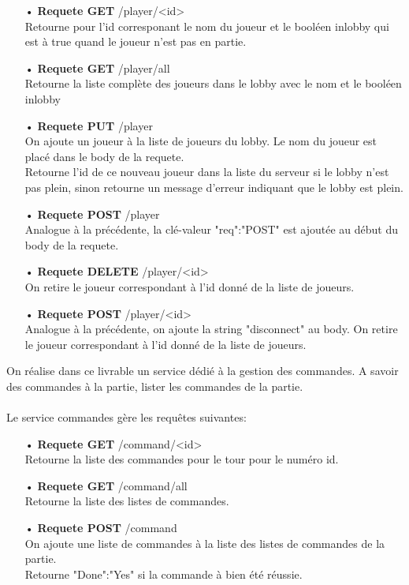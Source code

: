 \begin{itemize}
         \item[•]  \textbf{Requete GET}    /player/<id>\\
Retourne pour l'id corresponant le nom du joueur et le 
booléen inlobby qui est à true quand le joueur n'est pas en 
partie.

         \item[•]  \textbf{Requete GET}    /player/all\\
Retourne la liste complète des joueurs dans le lobby avec le
nom et le booléen inlobby

         \item[•]  \textbf{Requete PUT}    /player\\
On ajoute un joueur à la liste de joueurs du lobby. Le nom 
du joueur est placé dans le body de la requete. 
\\Retourne l'id de ce nouveau joueur dans la liste du 
serveur si le lobby n'est pas plein, sinon retourne un 
message d'erreur indiquant que le lobby est plein.

         \item[•]  \textbf{Requete POST}   /player\\
Analogue à la précédente, la clé-valeur "req":"POST" est 
ajoutée au début du body de la requete. 

         \item[•]  \textbf{Requete DELETE} /player/<id>\\
On retire le joueur correspondant à l'id donné de la liste
de joueurs. 

         \item[•]  \textbf{Requete POST}   /player/<id>\\
Analogue à la précédente, on ajoute la string "disconnect" 
au body. On retire le joueur correspondant à l'id 
donné de la liste de joueurs. 
\end{itemize}


On réalise dans ce livrable un 
service dédié à la gestion 
des commandes. A savoir des 
commandes à la partie, lister les 
commandes de la partie.
\\\\
Le service commandes gère les 
requêtes suivantes:

\begin{itemize}
         \item[•]  \textbf{Requete GET}    /command/<id>\\
Retourne la liste des commandes 
pour le tour pour le numéro id.

         \item[•]  \textbf{Requete GET}    /command/all\\
Retourne la liste des listes de commandes.

         \item[•]  \textbf{Requete POST}    /command\\
On ajoute une liste de commandes à 
la liste des listes de commandes 
de la partie. 
\\Retourne "Done":"Yes" si la commande à bien 
été réussie.
\end{itemize}

